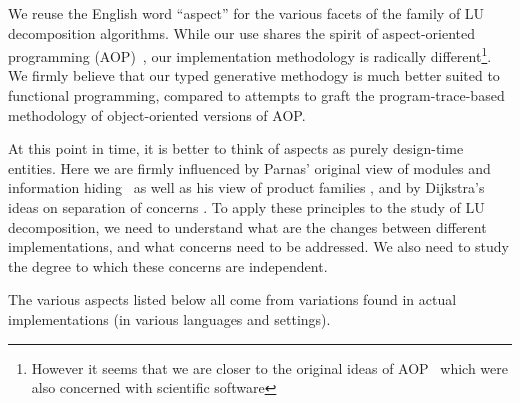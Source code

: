\documentclass[draft]{elsart}
\begin{document}
We reuse the English word ``aspect'' for the various facets of the family
of LU decomposition algorithms.  While our use shares the 
spirit of aspect-oriented programming (AOP)~\cite{kiczales97aspectoriented},
our implementation methodology is radically different\footnote{However it seems
that we are closer to the original ideas of AOP~\cite{709568,mendhekar97rg}
which were also concerned with scientific software}.  We firmly believe that
our typed generative methodogy is much better suited to functional
programming, compared to attempts to graft the program-trace-based
methodology of object-oriented versions of AOP.  

At this point in time, it is better to think of aspects as purely
design-time entities.  Here we are firmly influenced by Parnas' original
view of modules and information hiding~\cite{journals/cacm/parnas72a} as well
as his view of product families \cite{journals/tse/Parnas76}, and by
Dijkstra's ideas on separation of concerns \cite{EWD:EWD447}.
To apply these principles to the study of LU decomposition, we need
to understand what are the changes between different implementations, and 
what concerns need to be addressed.  We also need to study the degree
to which these concerns are independent.

The various aspects listed below all come from variations found in actual
implementations (in various languages and settings).
\end{document}
